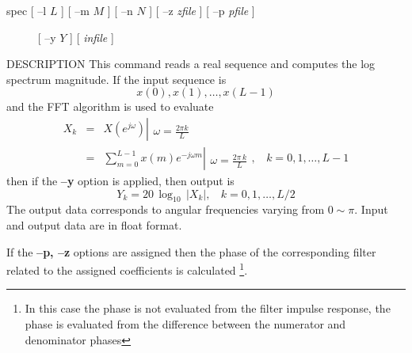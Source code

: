 
\begin{synopsis}
 \item[spec]   [ --l $L$ ] [ --m $M$ ] [ --n $N$ ] [ --z {\em zfile} ]
               [ --p {\em pfile} ]
 \item[\ ~~~~] [ --y $Y$ ] [ {\em infile} ]
\end{synopsis}

\begin{qsection}{DESCRIPTION}
This command reads a real sequence and computes the log spectrum
magnitude.
If the input sequence is
\begin{displaymath}
  x(0), x(1), \ldots, x(L-1)
\end{displaymath}
and the FFT algorithm is used to evaluate
\begin{eqnarray*}
  X_k &=& X(e^{j\omega}) \left|
	\begin{array}{c}
	\\
        \omega=\frac{2\pi k}{L}
	\end{array}
    \right. \nonumber \\
          &=& \sum_{m=0}^{L-1}x(m)e^{-j\omega m} \left|
	\begin{array}{c}
	\\
        \omega=\frac{2\pi\, k}{L}
	\end{array}
    \right.,~~~~ k=0,1,\ldots,L-1
\end{eqnarray*}
then if the {\bf --y} option is applied, then
output is
\begin{displaymath}
  Y_k=20\,\log_{10}\,|X_k|,~~~~ k=0,1,\ldots,L/2
\end{displaymath}
The output data corresponds to angular frequencies varying from $0\sim \pi$.
Input and output data are in float format.
\par
If the {\bf --p, --z} options are assigned
then the phase of the corresponding filter related to
the assigned coefficients is calculated
\footnote{
In this case the phase is not evaluated from the filter
impulse response, the phase is evaluated from
the difference between the numerator and denominator phases}.
\end{qsection}

